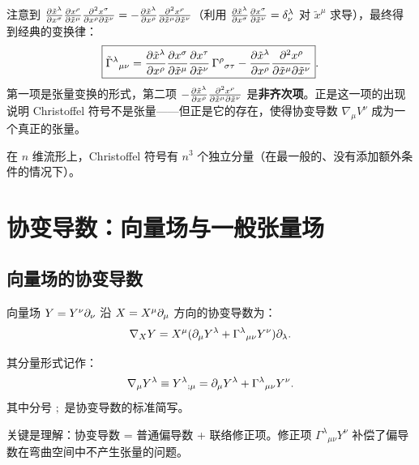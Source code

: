 注意到 $\frac{\partial\tilde{x}^\lambda}{\partial x^\sigma}\frac{\partial x^\rho}{\partial\tilde{x}^\mu}\frac{\partial^2 x^\sigma}{\partial x^\rho\partial\tilde{x}^\nu}
= -\frac{\partial\tilde{x}^\lambda}{\partial x^\rho}\frac{\partial^2 x^\rho}{\partial\tilde{x}^\mu\partial\tilde{x}^\nu}$（利用 $\frac{\partial\tilde{x}^\lambda}{\partial x^\sigma}\frac{\partial x^\sigma}{\partial\tilde{x}^\nu} = \delta^\lambda_\nu$ 对 $\tilde{x}^\mu$ 求导），最终得到经典的变换律：
\begin{equation}
    \boxed{\tilde{\Gamma}^\lambda{}_{\mu\nu} = \frac{\partial\tilde{x}^\lambda}{\partial x^\rho}\frac{\partial x^\sigma}{\partial\tilde{x}^\mu}\frac{\partial x^\tau}{\partial\tilde{x}^\nu}\,\Gamma^\rho{}_{\sigma\tau}
    - \frac{\partial\tilde{x}^\lambda}{\partial x^\rho}\frac{\partial^2 x^\rho}{\partial\tilde{x}^\mu\partial\tilde{x}^\nu}}.
\end{equation}
第一项是张量变换的形式，第二项 $- \frac{\partial\tilde{x}^\lambda}{\partial x^\rho}\frac{\partial^2 x^\rho}{\partial\tilde{x}^\mu\partial\tilde{x}^\nu}$ 是\textbf{非齐次项}。正是这一项的出现说明 Christoffel 符号不是张量——但正是它的存在，使得协变导数 $\nabla_\mu V^\nu$ 成为一个真正的张量。

在 $n$ 维流形上，Christoffel 符号有 $n^3$ 个独立分量（在最一般的、没有添加额外条件的情况下）。

\section{协变导数：向量场与一般张量场}

\subsection{向量场的协变导数}

\begin{definition}[协变导数]
向量场 $Y = Y^\nu \partial_\nu$ 沿 $X = X^\mu \partial_\mu$ 方向的协变导数为：
\begin{equation}
    \nabla_X Y = X^\mu (\partial_\mu Y^\lambda + \Gamma^\lambda{}_{\mu\nu} Y^\nu) \partial_\lambda.
\end{equation}

其分量形式记作：
\begin{equation}
    \nabla_\mu Y^\lambda \equiv Y^\lambda{}_{;\mu} = \partial_\mu Y^\lambda + \Gamma^\lambda{}_{\mu\nu} Y^\nu.
\end{equation}
其中分号 $;$ 是协变导数的标准简写。
\end{definition}

关键是理解：协变导数 = 普通偏导数 + 联络修正项。修正项 $\Gamma^\lambda{}_{\mu\nu} Y^\nu$ 补偿了偏导数在弯曲空间中不产生张量的问题。

